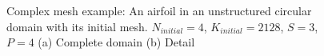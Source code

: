 \begin{figure}[H]
    \centering
    \hfill
    \caption{Complex mesh example: An airfoil in an unstructured circular domain with its initial 
        mesh. \(N_{initial} = 4\), \(K_{initial} = 2128\), \(S = 3\), \(P = 4\) (a) Complete domain 
        (b) Detail}\label{fig:complex_mesh}
\end{figure}

